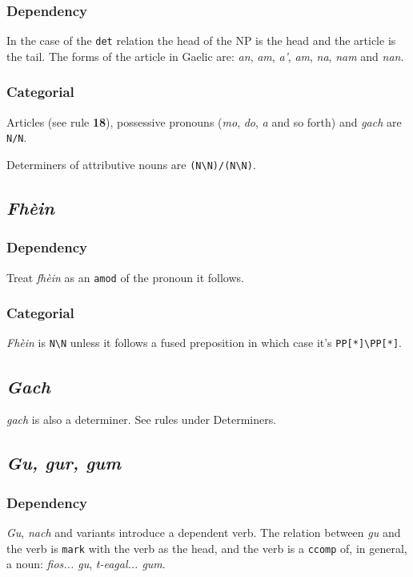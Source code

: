 \documentclass[a4paper]{article}
\begin{document}
\subsubsection{Dependency}
 In the case of the \texttt{det} relation the head of the NP is the head and the article is the tail. The forms of the article in Gaelic are: \textit{an}, \textit{am}, \textit{a'}, \textit{am}, \textit{na}, \textit{nam} and \textit{nan}.

\subsubsection{Categorial}

 Articles (see rule {\bf 18}), possessive pronouns (\textit{mo}, \textit{do}, \textit{a} and so forth) and \textit{gach} are \texttt{N/N}.

 Determiners of attributive nouns are \texttt{(N\textbackslash N)/(N\textbackslash N)}.


\subsection{\textit{Fh\`ein}}

\subsubsection{Dependency}
 Treat \textit{fh\`ein} as an \texttt{amod} of the pronoun it follows.

\subsubsection{Categorial}
 \textit{Fh\`ein} is \texttt{N\textbackslash N} unless it follows a fused preposition in which case it's \texttt{PP[*]\textbackslash PP[*]}.


\subsection{\textit{Gach}}

\textit{gach} is also a determiner. See rules under Determiners.

\subsection{\textit{Gu, gur, gum}}
\subsubsection{Dependency}
 \textit{Gu}, \textit{nach} and variants introduce a dependent verb. The relation between \textit{gu} and the verb is \texttt{mark} with the verb as the head, and the verb is a \texttt{ccomp} of, in general, a noun: \textit{fios... gu}, \textit{t-eagal... gum}.
\end{document}
